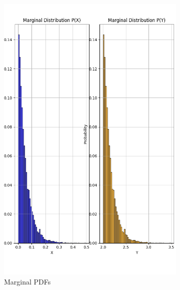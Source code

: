 \documentclass{article}
\begin{document}
\begin{figure}[H]
  \centering
  \begin{subfigure}{0.45\textwidth}
    \centering
    \includegraphics[width=\linewidth]{results/section2/d(1).png}
    \caption{Marginal PDFs}
  \end{subfigure}
  \hfill
  \begin{subfigure}{0.45\textwidth}
    \centering

\end{subfigure}
\end{figure}
\end{document}

